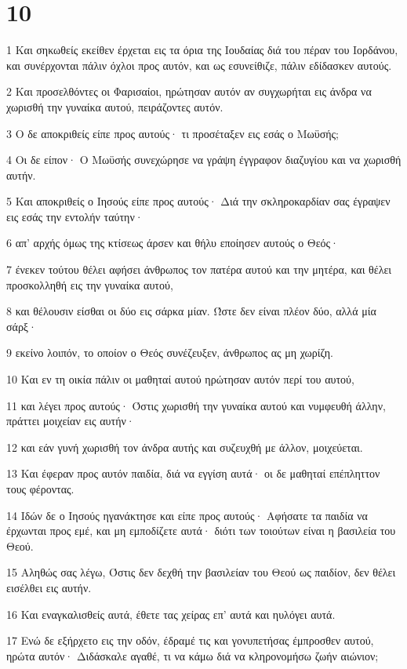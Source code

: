 \chapter{10}

\par 1 Και σηκωθείς εκείθεν έρχεται εις τα όρια της Ιουδαίας διά του πέραν του Ιορδάνου, και συνέρχονται πάλιν όχλοι προς αυτόν, και ως εσυνείθιζε, πάλιν εδίδασκεν αυτούς.
\par 2 Και προσελθόντες οι Φαρισαίοι, ηρώτησαν αυτόν αν συγχωρήται εις άνδρα να χωρισθή την γυναίκα αυτού, πειράζοντες αυτόν.
\par 3 Ο δε αποκριθείς είπε προς αυτούς· τι προσέταξεν εις εσάς ο Μωϋσής;
\par 4 Οι δε είπον· Ο Μωϋσής συνεχώρησε να γράψη έγγραφον διαζυγίου και να χωρισθή αυτήν.
\par 5 Και αποκριθείς ο Ιησούς είπε προς αυτούς· Διά την σκληροκαρδίαν σας έγραψεν εις εσάς την εντολήν ταύτην·
\par 6 απ' αρχής όμως της κτίσεως άρσεν και θήλυ εποίησεν αυτούς ο Θεός·
\par 7 ένεκεν τούτου θέλει αφήσει άνθρωπος τον πατέρα αυτού και την μητέρα, και θέλει προσκολληθή εις την γυναίκα αυτού,
\par 8 και θέλουσιν είσθαι οι δύο εις σάρκα μίαν. Ώστε δεν είναι πλέον δύο, αλλά μία σάρξ·
\par 9 εκείνο λοιπόν, το οποίον ο Θεός συνέζευξεν, άνθρωπος ας μη χωρίζη.
\par 10 Και εν τη οικία πάλιν οι μαθηταί αυτού ηρώτησαν αυτόν περί του αυτού,
\par 11 και λέγει προς αυτούς· Όστις χωρισθή την γυναίκα αυτού και νυμφευθή άλλην, πράττει μοιχείαν εις αυτήν·
\par 12 και εάν γυνή χωρισθή τον άνδρα αυτής και συζευχθή με άλλον, μοιχεύεται.
\par 13 Και έφεραν προς αυτόν παιδία, διά να εγγίση αυτά· οι δε μαθηταί επέπληττον τους φέροντας.
\par 14 Ιδών δε ο Ιησούς ηγανάκτησε και είπε προς αυτούς· Αφήσατε τα παιδία να έρχωνται προς εμέ, και μη εμποδίζετε αυτά· διότι των τοιούτων είναι η βασιλεία του Θεού.
\par 15 Αληθώς σας λέγω, Όστις δεν δεχθή την βασιλείαν του Θεού ως παιδίον, δεν θέλει εισέλθει εις αυτήν.
\par 16 Και εναγκαλισθείς αυτά, έθετε τας χείρας επ' αυτά και ηυλόγει αυτά.
\par 17 Ενώ δε εξήρχετο εις την οδόν, έδραμέ τις και γονυπετήσας έμπροσθεν αυτού, ηρώτα αυτόν· Διδάσκαλε αγαθέ, τι να κάμω διά να κληρονομήσω ζωήν αιώνιον;
